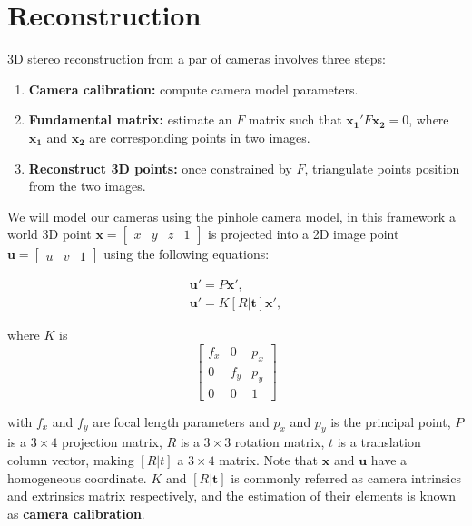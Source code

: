 \documentclass[12pt]{article}
\begin{document}
\FloatBarrier
\section{Reconstruction}

3D stereo reconstruction from a par of cameras involves three steps:
\begin{enumerate}
\item \textbf{Camera calibration:} compute camera model parameters.
\item \textbf{Fundamental matrix:} estimate an $F$ matrix such that $\mathbf{x_1}'F\mathbf{x_2} = 0$, where $\mathbf{x_1}$ and $\mathbf{x_2}$ are corresponding points in two images.
\item \textbf{Reconstruct 3D points:} once constrained by $F$, triangulate points position from the two images.
\end{enumerate}

We will model our cameras using the pinhole camera model, in this framework a world 3D point $\mathbf{x} = \begin{bmatrix} x & y & z & 1 \end{bmatrix}$ is projected into a 2D image point $\mathbf{u} = \begin{bmatrix} u & v & 1 \end{bmatrix}$ using the following equations:

\begin{gather}
	\mathbf{u}' = P \mathbf{x}', \label{eq:matrixP} \\
	\mathbf{u}' = K [R | \mathbf{t}] \mathbf{x}', \label{eq:matrixRT}
\end{gather}

where $K$ is 
\begin{equation}
\begin{bmatrix}
f_x & 0 & p_x \\ 
0 & f_y & p_y \\ 
0 & 0 & 1
\end{bmatrix}
\end{equation}

with $f_x$ and $f_y$ are focal length parameters and $p_x$ and $p_y$ is the principal point, $P$ is a $3 \times 4$ projection matrix, $R$ is a $3 \times 3$ rotation matrix, $t$ is a translation column vector, making $[R|t]$ a $3 \times 4$ matrix.
Note that $\mathbf{x}$ and $\mathbf{u}$ have a homogeneous coordinate.
$K$ and $[R|\mathbf{t}]$ is commonly referred as camera intrinsics and extrinsics matrix respectively, and the estimation of their elements is known as \textbf{camera calibration}.
\end{document}
